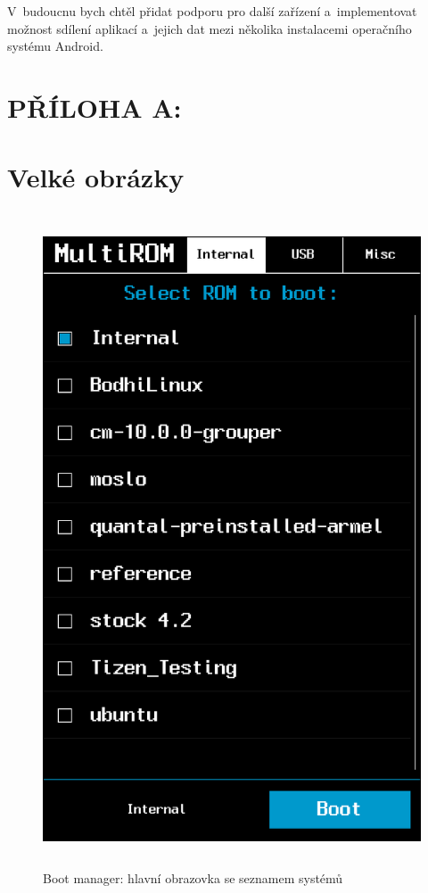 \documentclass[12pt, a4paper, oneside]{article}
\begin{document}
V~budoucnu bych chtěl přidat podporu pro další zařízení a~implementovat možnost sdílení aplikací a~jejich dat mezi několika instalacemi operačního systému Android.


\newpage
\voffset=-80pt
\addtolength{\textheight}{70pt}
\addtolength{\footskip}{70pt}
 \section*{PŘÍLOHA A:}
 \section*{Velké obrázky}
 \label{obrazky}

\addtolength{\textheight}{-70pt}
\begin{figure}[H]
\begin{center}
 \includegraphics[height=550pt]{../img/boot_manager.png}
\caption{Boot manager: hlavní obrazovka se seznamem systémů}
\end{center}
\end{figure}
\end{document}
